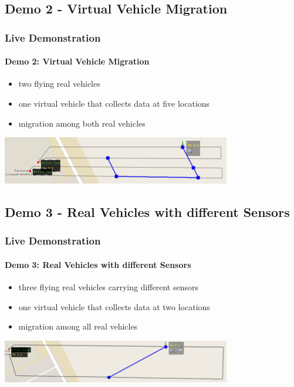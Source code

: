 \documentclass{beamer}
\begin{document}
\subsection{Demo 2 - Virtual Vehicle Migration}

\begin{frame}\frametitle{Live Demonstration}\framesubtitle{Demo 2: Virtual Vehicle Migration}
	\begin{itemize}
		\item two flying real vehicles
		\item one virtual vehicle that collects data at five locations
		\item migration among both real vehicles
	\end{itemize}
	\vspace{0.5cm}
	\begin{center}
		{\includegraphics[width=10cm]{demo2.png}}
	\end{center}
\end{frame}

\subsection{Demo 3 - Real Vehicles with different Sensors}

\begin{frame}\frametitle{Live Demonstration}\framesubtitle{Demo 3: Real Vehicles with different Sensors}
	\begin{itemize}
		\item three flying real vehicles carrying different sensors
		\item one virtual vehicle that collects data at two locations
		\item migration among all real vehicles
	\end{itemize}
	\vspace{0.5cm}
	\begin{center}
		{\includegraphics[width=10cm]{demo3.png}}
	\end{center}
\end{frame}
\end{document}

